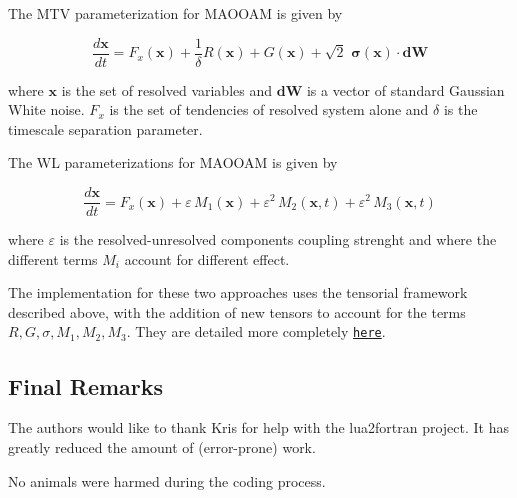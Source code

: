 The M\+TV parameterization for M\+A\+O\+O\+AM is given by

\[ \frac{d\boldsymbol{x}}{dt} = F_x(\boldsymbol{x}) + \frac{1}{\delta} R(\boldsymbol{x}) + G(\boldsymbol{x}) + \sqrt{2} \,\, \boldsymbol{\sigma}(\boldsymbol{x}) \cdot \boldsymbol{dW} \]

where $\boldsymbol{x}$ is the set of resolved variables and $\boldsymbol{dW}$ is a vector of standard Gaussian White noise. $F_x$ is the set of tendencies of resolved system alone and $\delta$ is the timescale separation parameter.

The WL parameterizations for M\+A\+O\+O\+AM is given by

\[\frac{d\boldsymbol{x}}{dt} = F_x(\boldsymbol{x}) + \varepsilon \, M_1(\boldsymbol{x}) + \varepsilon^2 \, M_2(\boldsymbol{x},t) + \varepsilon^2 \, M_3 (\boldsymbol{x},t)\]

where $\varepsilon$ is the resolved-\/unresolved components coupling strenght and where the different terms $M_i$ account for different effect.

The implementation for these two approaches uses the tensorial framework described above, with the addition of new tensors to account for the terms $R,G,\sigma,M_1,M_2,M_3$. They are detailed more completely \href{md_sto_doc.html}{\tt here}.





\subsection*{Final Remarks}

The authors would like to thank Kris for help with the lua2fortran project. It has greatly reduced the amount of (error-\/prone) work.

No animals were harmed during the coding process. 